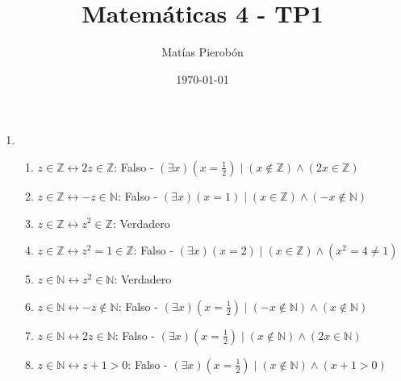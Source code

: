 \documentclass[11pt]{article}
\title{Matemáticas 4 - TP1}
\author{Matías Pierobón}
\date{\today}
\begin{document}
\maketitle

\begin{enumerate}
\item 
\begin{enumerate}
	\item $z \in \mathbb{Z} \leftrightarrow 2 z \in \mathbb{Z}$: Falso - $\left(\exists x\right) \left(x = \frac{1}{2}\right) \mid \left(x \not \in \mathbb{Z}\right) \land \left(2x \in \mathbb{Z}\right)$
	\item $z \in \mathbb{Z} \leftrightarrow -z \in \mathbb{N}$: Falso - $\left(\exists x\right) \left(x = 1\right) \mid \left(x \in \mathbb{Z}\right) \land \left(-x \notin \mathbb{N}\right)$
	\item $z \in \mathbb{Z} \leftrightarrow z^2 \in \mathbb{Z}$: Verdadero
	\item $z \in \mathbb{Z} \leftrightarrow z^2 = 1 \in \mathbb{Z}$: Falso - $\left(\exists x\right) \left(x = 2\right) \mid \left(x \in \mathbb{Z}\right) \land \left(x^2 = 4 \neq 1\right)$
	\item $z \in \mathbb{N} \leftrightarrow z^2 \in \mathbb{N}$: Verdadero
	\item $z \in \mathbb{N} \leftrightarrow -z \notin \mathbb{N}$: Falso - $\left(\exists x\right) \left(x = \frac{1}{2}\right) \mid \left(-x \not \in \mathbb{N}\right) \land \left(x \not \in \mathbb{N}\right)$
	\item $z \in \mathbb{N} \leftrightarrow 2z \in \mathbb{N}$: Falso - $\left(\exists x\right) \left(x = \frac{1}{2}\right) \mid \left(x \not \in \mathbb{N}\right) \land \left(2x \in \mathbb{N}\right)$
	\item $z \in \mathbb{N} \leftrightarrow z + 1 > 0$: Falso - $\left(\exists x\right) \left(x = \frac{1}{2}\right) \mid \left(x \not \in \mathbb{N}\right) \land \left(x + 1 > 0\right)$
\end{enumerate}


\end{enumerate}
\end{document}
